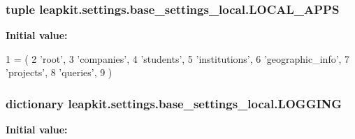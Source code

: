 \hypertarget{namespaceleapkit_1_1settings_1_1base__settings__local_a5ff0b2d3a2d30f22997751f82d8fa0a8}{
\subsubsection[{L\-O\-C\-A\-L\-\_\-\-A\-P\-P\-S}]{\setlength{\rightskip}{0pt plus 5cm}tuple leapkit.\-settings.\-base\-\_\-settings\-\_\-local.\-L\-O\-C\-A\-L\-\_\-\-A\-P\-P\-S}}\label{namespaceleapkit_1_1settings_1_1base__settings__local_a5ff0b2d3a2d30f22997751f82d8fa0a8}
{\bfseries Initial value\-:}
\begin{DoxyCode}
1 = (
2     \textcolor{stringliteral}{'root'},
3     \textcolor{stringliteral}{'companies'},
4     \textcolor{stringliteral}{'students'},
5     \textcolor{stringliteral}{'institutions'},
6     \textcolor{stringliteral}{'geographic\_info'},
7     \textcolor{stringliteral}{'projects'},
8     \textcolor{stringliteral}{'queries'},
9 )
\end{DoxyCode}
\hypertarget{namespaceleapkit_1_1settings_1_1base__settings__local_a09597bb472de58a72c8ca258d2284db5}{
\subsubsection[{L\-O\-G\-G\-I\-N\-G}]{\setlength{\rightskip}{0pt plus 5cm}dictionary leapkit.\-settings.\-base\-\_\-settings\-\_\-local.\-L\-O\-G\-G\-I\-N\-G}}\label{namespaceleapkit_1_1settings_1_1base__settings__local_a09597bb472de58a72c8ca258d2284db5}
{\bfseries Initial value\-:}
